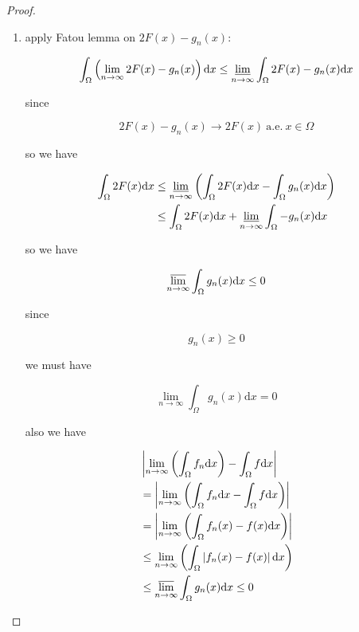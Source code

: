 \documentclass[11pt,a4paper]{article}
\begin{document}
\begin{proof}
\begin{enumerate}
        \item apply Fatou lemma on $2F(x) - g_n(x)$:

        \[
            \int_{\Omega} \left(\lim_{n \to \infty} 2F(x) - g_n(x)\right) \mathrm{d}x \le \varliminf_{n \to \infty} \int_{\Omega} 2F(x) - g_n(x) \mathrm{d}x
        \]

        since

        \[
            2F(x) - g_n(x) \to 2F(x) \: \text{a.e.} \: x \in \Omega
        \]

        so we have

        \begin{align*}
            \int_{\Omega} 2F(x) \mathrm{d}x &\le \varliminf_{n \to \infty}\left( \int_{\Omega} 2F(x) \mathrm{d}x - \int_{\Omega} g_n(x) \mathrm{d}x\right) \\
            & \le \int_{\Omega} 2F(x) \mathrm{d}x + \varliminf_{n \to \infty} \int_{\Omega} -g_n(x) \mathrm{d}x
        \end{align*}

        so we have

        \[
            \varlimsup_{n \to \infty}\int_{\Omega} g_n(x) \mathrm{d}x \le 0
        \]

        since

        \[
            g_n(x) \ge 0
        \]

        we must have

        \[
            \lim_{n \to \infty}\int_{\Omega} g_n(x) \mathrm{d}x = 0
        \]

        also we have

        \begin{align*}
            & \left| \lim_{n \to \infty} \left(\int_{\Omega} f_n \mathrm{d}x\right) -  \int_{\Omega} f \mathrm{d}x  \right| \\
            & = \left| \lim_{n \to \infty} \left(\int_{\Omega} f_n \mathrm{d}x -  \int_{\Omega} f \mathrm{d}x \right) \right| \\ 
            & = \left| \lim_{n \to \infty} \left(\int_{\Omega} f_n(x) - f(x) \mathrm{d}x \right) \right| \\
            & \le \lim_{n \to \infty} \left(\int_{\Omega} \left| f_n(x) - f(x) \right| \mathrm{d}x \right)  \\
            & \le \varlimsup_{n \to \infty} \int_{\Omega} g_n(x) \mathrm{d}x \le 0
        \end{align*}
    \end{enumerate}
\end{proof}
\end{document}
